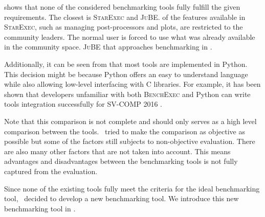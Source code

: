  shows that none of the considered benchmarking tools fully fulfill the given requirements.
The closest is \textsc{StarExec} and \textsc{JuBE}.
 of the features available in \textsc{StarExec}, such as managing post-processors and plots, are restricted to the community leaders.
The normal user is forced to use what was already available in the community space.
 \textsc{JuBE} that approaches benchmarking in .

Additionally, it can be seen from  that most tools are implemented in Python.
This decision might be because Python offers an easy to understand language while also allowing low-level interfacing with C libraries.
For example, it has been shown that developers unfamiliar with both \textsc{BenchExec} and Python can write tools integration successfully for SV-COMP 2016 \citep{beyerReliableBenchmarkingRequirements2019}.

Note that this comparison is not complete and should only serves as a high level comparison between the tools.
\First~tried to make the comparison as objective as possible but some of the factors still subjects to non-objective evaluation.
There are also many other factors that are not taken into account.
This means advantages and disadvantages between the benchmarking tools is not fully captured from the evaluation.

Since none of the existing tools fully meet the criteria for the ideal benchmarking tool, \first~decided to develop a new benchmarking tool.
We introduce this new benchmarking tool in .

